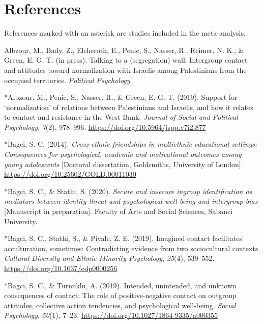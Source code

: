 \documentclass[12pt, letterpaper]{article}
\newcommand{\refsection}{\newpage \section{References}}
\newenvironment{CSLReferences}[2]{}{}
\begin{document}
\refsection

References marked with an asterisk are studies included in the
meta-analysis.

\begingroup

\noindent \setlength{\parindent}{-0.5in} \setlength{\leftskip}{0.5in}
\small

\hypertarget{refs}{}
\begin{CSLReferences}{1}{0}
\leavevmode\hypertarget{ref-albzour_talking_inpress}{}%
Albzour, M., Bady, Z., Elcheroth, E., Penic, S., Nasser, R., Reimer, N.
K., \& Green, E. G. T. (in press). Talking to a (segregation) wall:
Intergroup contact and attitudes toward normalization with {Israelis}
among {Palestinians} from the occupied territories. \emph{Political
Psychology}.

\leavevmode\hypertarget{ref-3201}{}%
*Albzour, M., Penic, S., Nasser, R., \& Green, E. G. T. (2019). Support
for {`normalization'} of relations between {Palestinians} and
{Israelis}, and how it relates to contact and resistance in the {West}
{Bank}. \emph{Journal of Social and Political Psychology}, \emph{7}(2),
978--996. \url{https://doi.org/10.5964/jspp.v7i2.877}

\leavevmode\hypertarget{ref-2023}{}%
*Bagci, S. C. (2014). \emph{Cross-ethnic friendships in multiethnic
educational settings: {Consequences} for psychological, academic and
motivational outcomes among young adolescents} {[}Doctoral dissertation,
Goldsmiths, University of London{]}.
\url{https://doi.org/10.25602/GOLD.00011030}

\leavevmode\hypertarget{ref-2395}{}%
*Bagci, S. C., \& Stathi, S. (2020). \emph{Secure and insecure ingroup
identification as mediators between identity threat and psychological
well-being and intergroup bias} {[}Manuscript in preparation{]}.
{Faculty of Arts and Social Sciences, Sabanci University}.

\leavevmode\hypertarget{ref-423}{}%
*Bagci, S. C., Stathi, S., \& Piyale, Z. E. (2019). Imagined contact
facilitates acculturation, sometimes: {Contradicting} evidence from two
sociocultural contexts. \emph{Cultural Diversity and Ethnic Minority
Psychology}, \emph{25}(4), 539--552.
\url{https://doi.org/10.1037/cdp0000256}

\leavevmode\hypertarget{ref-322}{}%
*Bagci, S. C., \& Turnuklu, A. (2019). Intended, unintended, and unknown
consequences of contact: {The} role of positive-negative contact on
outgroup attitudes, collective action tendencies, and psychological
well-being. \emph{Social Psychology}, \emph{50}(1), 7--23.
\url{https://doi.org/10.1027/1864-9335/a000355}


\end{CSLReferences}
\end{document}
